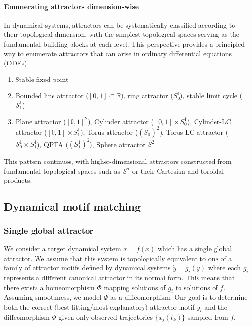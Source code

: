 \documentclass{article}
\newcommand{\ascomment}[1]{\textcolor{ascolor}{(#1)}}
\theoremstyle{definition} \newtheorem{definition}{Definition}  \newtheorem{example}{Example}
\theoremstyle{remark} \newtheorem{remark}{Remark}
\newcommand{\reals}{\mathbb{R}}
\newcounter{ct}
\begin{document}
\paragraph{Enumerating attractors dimension-wise}
In dynamical systems, attractors can be systematically classified according to their topological dimension, with the simplest topological spaces serving as the fundamental building blocks at each level.
 This perspective provides a principled way to enumerate attractors that can arise in ordinary differential equations (ODEs).
\begin{enumerate}[start=0,label={\bfseries Dim \arabic*:}]
\item  Stable fixed point
\item  Bounded line attractor ($[0,1]\subset\reals$), ring attractor ($S_0^1$), stable limit cycle ($S_1^1$)
\item Plane attractor ($[0,1]^2$), Cylinder attractor ($[0,1]\times S_0^1$), Cylinder-LC attractor ($[0,1]\times S_1^1$), Torus attractor ($(S_0^1)^2$), Torus-LC attractor ($S_0^1\times S_1^1$), QPTA ($(S_1^1)^2$), Sphere attractor $S^2$
\end{enumerate}
This pattern continues, with higher-dimensional attractors constructed from fundamental topological spaces such as $S^n$ or their Cartesian and toroidal products.


%

\subsection{Dynamical motif matching}
\subsubsection{Single global attractor}
We consider a target dynamical system $\dot{x} = f(x)$ which has a single global attractor.
 We assume that this system is topologically equivalent to one of a family of attractor motifs defined by dynamical systems $\dot{y} = g_i(y)$ where each $g_i$ represents a different canonical attractor in its normal form.
  This means that there exists a homeomorphism $\Phi$ mapping solutions of $g_i$ to solutions of $f$.
  Assuming smoothness, we model $\Phi$ as a diffeomorphism.
Our goal is to determine both the correct (best fitting/most explanatory) attractor motif $g_i$ and the diffeomorphism $\Phi$ given only observed trajectories $\{x_j(t_k)\}$ sampled from $f$.
\end{document}
